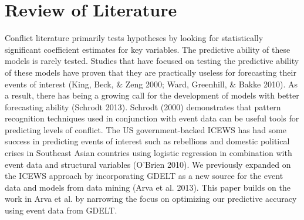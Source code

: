 \documentclass[12pt, letterpaper]{article}
\begin{document}
\section*{Review of Literature}
Conflict literature primarily tests hypotheses by looking for statistically significant coefficient estimates for key variables. The predictive ability of these models is rarely tested. Studies that have focused on testing the predictive ability of these models have proven that they are practically useless for forecasting their events of interest (King, Beck, & Zeng 2000; Ward, Greenhill, & Bakke 2010). As a result, there has being a growing call for the development of models with better forecasting ability (Schrodt 2013). Schrodt (2000) demonstrates that pattern recognition techniques used in conjunction with event data can be useful tools for predicting levels of conflict. The US government-backed ICEWS has had some success in predicting events of interest such as rebellions and domestic political crises in Southeast Asian countries using logistic regression in combination with event data and structural variables (O'Brien 2010). We previously expanded on the ICEWS approach by incorporating GDELT as a new source for the event data and models from data mining (Arva et al. 2013). This paper builds on the work in Arva et al. by narrowing the focus on optimizing our predictive accuracy using event data from GDELT. \\
\end{document}

